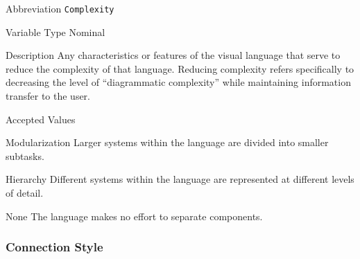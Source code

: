 \begin{AlignedDesc}
  \item[Abbreviation] \texttt{Complexity}

  \item[Variable Type] Nominal

  \item[Description] Any characteristics or features of the visual language
  that serve to reduce the complexity of that language. Reducing complexity
  refers specifically to decreasing the level of ``diagrammatic
  complexity'' while maintaining information transfer to the
  user.~\cite{moody2009}

  \item[Accepted Values]

  \begin{AlignedDesc}
    \item[Modularization] Larger systems within the language are divided
    into smaller subtasks.~\cite{moody2009}
    \item[Hierarchy] Different systems within the language are represented
    at different levels of detail.~\cite{moody2009}
    \item[None] The language makes no effort to separate components.
  \end{AlignedDesc}

\end{AlignedDesc}

\subsubsection{Connection Style}
\label{subsubsec:connection}


